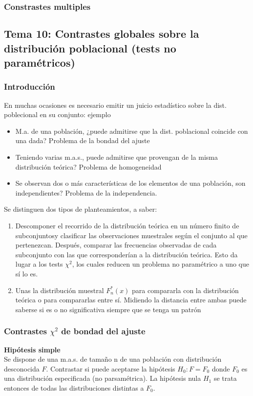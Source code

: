 \documentclass[a4paper,12pt]{article}
\begin{document}
\subsubsection{Constrastes multiples}

\subsection{Tema 10: Contrastes globales sobre la distribución poblacional (tests no paramétricos)}
\subsubsection{Introducción}
En muchas ocasiones es necesario emitir un juicio estadístico sobre la dist. poblecional en su conjunto: ejemplo
\begin{itemize}
\item M.a. de una población, ¿puede admitirse que la dist. poblacional coincide con una dada? Problema de la bondad del ajuste
\item Teniendo varias m.a.s., puede admitirse que provengan de la misma distribución teórica? Problema de homogeneidad
\item Se observan dos o más características de los elementos de una población, son independientes? Problema de la independencia.
\end{itemize}

Se distinguen dos tipos de planteamientos, a saber:
\begin{enumerate}
\item Descomponer el recorrido de la distribución teórica en un número finito de subconjuntosy clasificar las observaciones muestrales según el conjunto al que pertenezcan. Después, comparar las frecuencias observadas de cada subconjunto con las que corresponderían a la distribución teórica. Esto da lugar a los tests $\chi^2$, los cuales reducen un problema no paramétrico a uno que sí lo es.
\item Unas la distribución muestral $F^*_n(x)$ para compararla con la distribución teórica o para compararlas entre sí. Midiendo la distancia entre ambas puede saberse si es o no significativa siempre que se tenga un patrón
\end{enumerate}

\subsubsection{Contrastes $\chi^2$ de bondad del ajuste}
\textbf{Hipótesis simple} \\
Se dispone de una m.a.s. de tamaño n de una población con distribución desconocida $F$. Contrastar si puede aceptarse la hipótesis $H_0 : F = F_0$ donde $F_0$ es una distribución especificada (no parsamétrica). La hipótesis nula $H_1$ se trata entonces de todas las distribuciones distintas a $F_0$.
\end{document}
